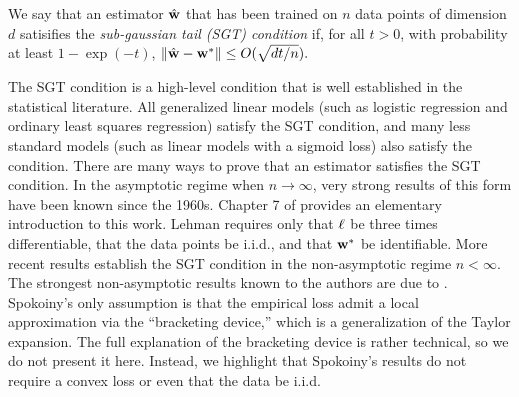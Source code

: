 \documentclass[thesis.tex]{subfiles}
\begin{document}
\begin{definition}
We say that an estimator ${\hat{\mathbf w}}$ that has been trained on $n$ data points of dimension $d$ satisifies the \emph{sub-gaussian tail (SGT) condition} if,
for all $t>0$,
with probability at least $1-\exp(-t)$,
${\lVert {{\hat{\mathbf w}}-{\mathbf w^{*}}} \rVert} \le O( \sqrt{dt/n} ).$
\end{definition}


The SGT condition is a high-level condition that is well established in the statistical literature.
All generalized linear models (such as logistic regression and ordinary least squares regression) satisfy the SGT condition,
and many less standard models (such as linear models with a sigmoid loss) also satisfy the condition. 
There are many ways to prove that an estimator satisfies the SGT condition.
In the asymptotic regime when $n\to\infty$,
very strong results of this form have been known since the 1960s.
Chapter 7 of \citet{lehmann1999elements} provides an elementary introduction to this work.
Lehman requires only that $\ell$ be three times differentiable, that the data points be i.i.d., and that ${\mathbf w^{*}}$ be identifiable.
More recent results establish the SGT condition in the non-asymptotic regime $n<\infty$.
The strongest non-asymptotic results known to the authors are due to \citet{spokoiny2012parametricestimation}.
Spokoiny's only assumption is that the empirical loss admit a local approximation via the ``bracketing device,''
which is a generalization of the Taylor expansion.
The full explanation of the bracketing device is rather technical,
so we do not present it here.
Instead, we highlight that Spokoiny's results do not require a convex loss or even that the data be i.i.d. 
\end{document}

